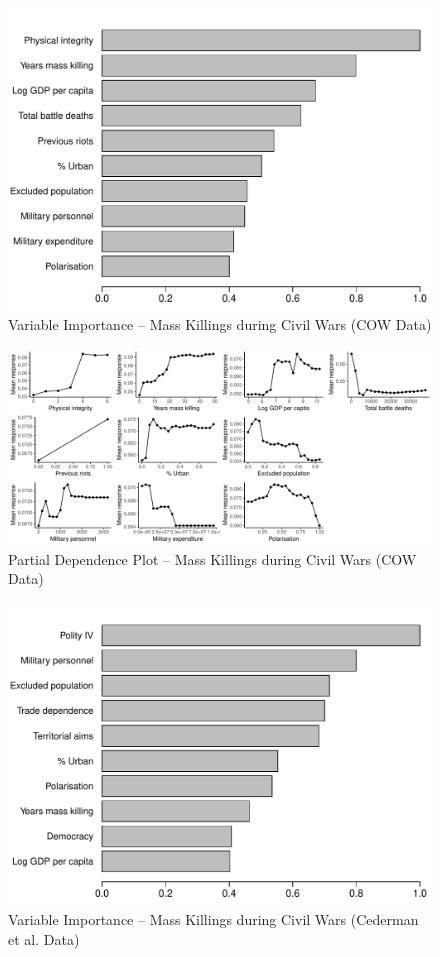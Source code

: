 \begin{figure}
    \centering
    \includegraphics[width=.85\textwidth]{images/rf-cow.pdf}
    \caption{Variable Importance -- Mass Killings during Civil Wars (COW Data)}
    \label{fig:rf-mk-ucdp}
\end{figure}

\newpage 

\clearpage
\begin{figure}
    \centering
    \includegraphics[width=\textwidth]{images/rf-cow-pd.pdf}
    \caption{Partial Dependence Plot -- Mass Killings during Civil Wars (COW Data)}
    \label{fig:rf-mk-ucdp-pd}
\end{figure}
\clearpage

\begin{figure}[H]
    \centering
    \includegraphics[width=.85\textwidth]{images/rf-eth.pdf}
    \caption{Variable Importance -- Mass Killings during Civil Wars (Cederman et al. Data)}
    \label{fig:rf-mk-ucdp}
\end{figure}

